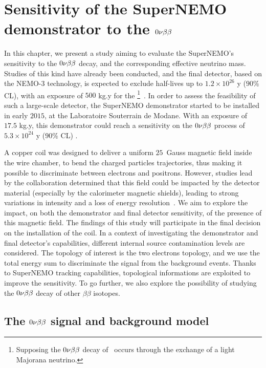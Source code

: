 \chapter{Sensitivity of the SuperNEMO demonstrator to the $0\nu\beta\beta$}
\label{ch:sensitivity}

In this chapter, we present a study aiming to evaluate the SuperNEMO's sensitivity to the $0\nu\beta\beta$ decay, and the corresponding effective neutrino mass.
Studies of this kind have already been conducted, and the final detector, based on the NEMO-$3$ technology, is expected to exclude half-lives up to $1.2\times 10^{26}$ y ($90\%$ CL), with an exposure of $500$ kg.y for the \Se\footnote{Supposing the  $0\nu\beta\beta$ decay of \Se\ occurs through the exchange of a light Majorana neutrino.}~\cite{art:SuperNEMO2010}.
In order to assess the feasibility of such a large-scale detector, the SuperNEMO demonstrator started to be installed in early $2015$, at the Laboratoire Souterrain de Modane.
With an exposure of $17.5$ kg.y, this demonstrator could reach a sensitivity on the $0\nu\beta\beta$ process of \Se\ $5.3\times 10^{24}$ y ($90\%$ CL) \cite{CalvezThesis}.

A copper coil was designed to deliver a uniform $25$~Gauss magnetic field inside the wire chamber, to bend the charged particles trajectories, thus making it possible to discriminate between electrons and positrons.
However, studies lead by the collaboration determined that this field could be impacted by the detector material (especially by the calorimeter magnetic shields), leading to strong variations in intensity and a loss of energy resolution~\cite{CalvezThesis}\cite{internal:magnetic_field}.
We aim to explore the impact, on both the demonstrator and final detector sensitivity, of the presence of this magnetic field.
The findings of this study will participate in the final decision on the installation of the coil.
In a context of investigating the demonstrator and final detector's capabilities, different internal source contamination levels are considered.
The topology of interest is the two electrons topology, and we use the total energy sum to discriminate the signal from the background events.
Thanks to SuperNEMO tracking capabilities, topological informations are exploited to improve the sensitivity.
To go further, we also explore the possibility of studying the $0\nu\beta\beta$ decay of other $\beta\beta$ isotopes.

\section{The $0\nu\beta\beta$ signal and background model}
\label{sec:sensitivity_simus}


